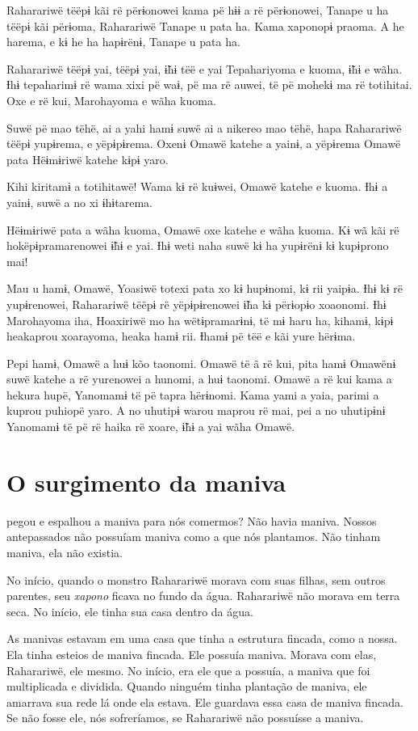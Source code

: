 Raharariwë tëëpɨ kãi rë përɨonowei kama pë hɨɨ a rë përɨonowei, Tanape u
ha tëëpɨ kãi përɨoma, Raharariwë Tanape u pata ha. Kama xaponopɨ praoma.
A he harema, e kɨ he ha hapɨrënɨ, Tanape u pata ha. 

Raharariwë tëëpɨ yai, tëëpɨ yai, ɨ̃hɨ tëë e yai Tepahariyoma e kuoma, ɨ̃hɨ
 e wãha. Ɨhɨ tepaharimɨ rë wama xixi pë waɨ, pë ma rë auwei, të pë mohekɨ
 ma rë totihitai. Oxe e rë kui, Marohayoma e wãha kuoma. 

Suwë pë mao tëhë, ai a yahi hamɨ suwë ai a nikereo mao tëhë, hapa
 Raharariwë tëëpɨ yupɨrema, e yëpɨpɨrema. Oxenɨ Omawë katehe a yainɨ, a
 yëpɨrema Omawë pata Hëɨmɨriwë katehe kɨpɨ yaro.

Kihi kiritamɨ a totihitawë! Wama kɨ rë kuɨwei, Omawë katehe e kuoma. Ɨhɨ
a yainɨ, suwë a no xi ɨhɨtarema. 

Hëɨmɨriwë pata a wãha kuoma, Omawë oxe katehe e wãha kuoma. Kɨ wã kãi rë
hokëpɨpramarenowei ɨ̃hɨ e yai. Ɨhɨ weti naha suwë kɨ ha yupɨrënɨ kɨ
kupɨprono mai! 

Mau u hamɨ, Omawë, Yoasiwë totexi pata xo kɨ hupɨnomi, kɨ rii yaipɨa.
 Ɨhɨ kɨ rë yupɨrenowei, Raharariwë tëëpɨ rë yëpɨpɨrenowei ɨ̃ha kɨ përɨopɨo
 xoaonomi. Ɨhɨ Marohayoma iha, Hoaxiriwë mo ha wëtɨpramarɨnɨ, të mɨ haru
 ha, kihamɨ, kɨpɨ heakaprou xoarayoma, heaka hamɨ rii. Ɨhamɨ pë tëë e kãi
 yure hërɨma. 

Pepi hamɨ, Omawë a huɨ kõo taonomi. Omawë të ã rë kui, pita hamɨ Omawënɨ
suwë katehe a rë yurenowei a hunomi, a huɨ taonomi. Omawë a rë kui kama
a hekura hupë, Yanomamɨ të pë tapra hërɨnomi. Kama yami a yaia, parimi a
kuprou puhiopë yaro. A no uhutipɨ warou maprou rë mai, pei a no
uhutipɨnɨ Yanomamɨ të pë rë haika rë xoare, ɨ̃hɨ a yai wãha Omawë. 

\chapter{O surgimento da maniva}
 
 pegou e espalhou a maniva para nós comermos? Não havia maniva.
Nossos antepassados não possuíam maniva como a que nós plantamos. Não
tinham maniva, ela não existia. 

No início, quando o monstro Raharariwë morava com suas filhas, sem outros
parentes, seu \textit{xapono} ficava no fundo da água. Raharariwë não morava em
terra seca. No início, ele tinha sua casa dentro da água. 

As manivas estavam em uma casa que tinha a estrutura fincada, como a
nossa. Ela tinha esteios de maniva fincada. Ele possuía maniva. Morava
com elas, Raharariwë, ele mesmo. No início, era ele que a possuía, a
maniva que foi multiplicada e dividida. Quando ninguém tinha plantação
de maniva, ele amarrava sua rede lá onde ela estava. Ele guardava essa casa
de maniva fincada. Se não fosse ele, nós sofreríamos, se Raharariwë não
possuísse a maniva. 

